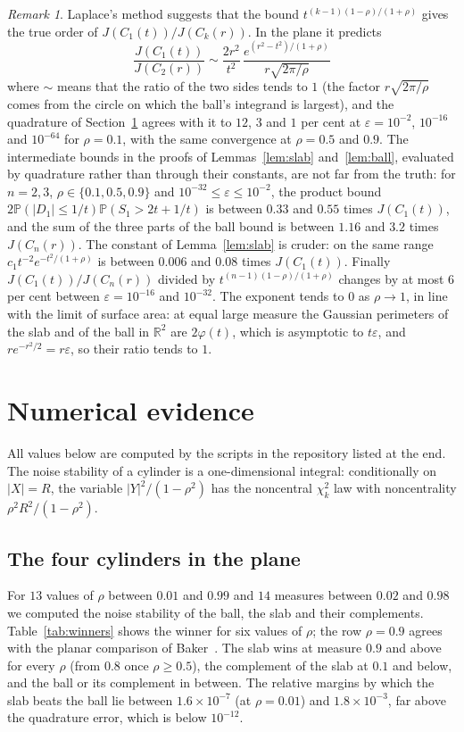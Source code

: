 \documentclass[11pt]{amsart}
\theoremstyle{remark}
\newtheorem{remark}[theorem]{Remark}
\newcommand{\R}{\mathbb{R}}
\newcommand{\Prob}{\mathbb{P}}
\begin{document}
\begin{remark}\label{rem:sharp}
Laplace's method suggests that the bound $t^{(k-1)(1-\rho)/(1+\rho)}$ gives the true order of $J(C_1(t))/J(C_k(r))$. In
the plane it predicts
\[
\frac{J(C_1(t))}{J(C_2(r))}\sim\frac{2r^2}{t^2}\,\frac{e^{(r^2-t^2)/(1+\rho)}}{r\sqrt{2\pi/\rho}}
\]
where $\sim$ means that the ratio of the two sides tends to $1$ (the factor $r\sqrt{2\pi/\rho}$ comes from the circle on which the ball's integrand is largest), and the quadrature of
Section~\ref{sec:numerics} agrees with it to $12$, $3$ and $1$ per cent at $\varepsilon=10^{-2}$, $10^{-16}$ and
$10^{-64}$ for $\rho=0.1$, with the same convergence at $\rho=0.5$ and $0.9$. The intermediate bounds in the
proofs of Lemmas~\ref{lem:slab} and~\ref{lem:ball}, evaluated by quadrature rather than through their constants, are
not far from the truth: for $n=2,3$, $\rho\in\{0.1,0.5,0.9\}$ and $10^{-32}\le\varepsilon\le10^{-2}$, the product
bound $2\Prob(|D_1|\le1/t)\Prob(S_1>2t+1/t)$ is between $0.33$ and $0.55$ times $J(C_1(t))$, and the sum of the three
parts of the ball bound is between $1.16$ and $3.2$ times $J(C_n(r))$. The constant of Lemma~\ref{lem:slab} is cruder:
on the same range $c_1t^{-2}e^{-t^2/(1+\rho)}$ is between $0.006$ and $0.08$ times $J(C_1(t))$. Finally $J(C_1(t))/J(C_n(r))$ divided by $t^{(n-1)(1-\rho)/(1+\rho)}$ changes by
at most $6$ per cent between $\varepsilon=10^{-16}$ and $10^{-32}$. The exponent tends to $0$ as $\rho\to1$,
in line with the limit of surface area: at equal large measure the Gaussian perimeters of the slab and of the ball
in $\R^2$ are $2\varphi(t)$, which is asymptotic to $t\varepsilon$, and $re^{-r^2/2}=r\varepsilon$, so their ratio tends to $1$.
\end{remark}

\section{Numerical evidence}\label{sec:numerics}

All values below are computed by the scripts in the repository listed at the end. The noise stability of a cylinder is
a one-dimensional integral: conditionally on $|X|=R$, the variable $|Y|^2/(1-\rho^2)$ has the noncentral $\chi^2_k$
law with noncentrality $\rho^2R^2/(1-\rho^2)$.

\subsection*{The four cylinders in the plane}
For $13$ values of $\rho$ between $0.01$ and $0.99$ and $14$ measures between $0.02$ and $0.98$ we computed the noise
stability of the ball, the slab and their complements. Table~\ref{tab:winners} shows the winner for six values of
$\rho$; the row $\rho=0.9$ agrees with the planar comparison of Baker~\cite[Section~3.4]{Baker}. The slab wins at measure $0.9$ and above for every $\rho$ (from $0.8$ once $\rho\ge0.5$), the complement of the
slab at $0.1$ and below, and the ball or its complement in between. The relative margins by which the slab beats the
ball lie between $1.6\times10^{-7}$ (at $\rho=0.01$) and $1.8\times10^{-3}$, far above the quadrature error, which is
below $10^{-12}$.
\end{document}
